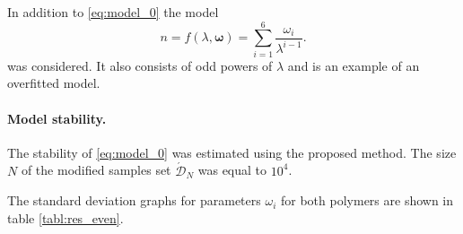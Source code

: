 \documentclass[11pt,a4paper]{article}
\theoremstyle{definition}
\begin{document}
In addition to \eqref{eq:model_0} the model
\begin{equation}
  n = f(\lambda, \boldsymbol{\omega}) = \sum_{i = 1}^6 \frac{\omega_i}{\lambda^{i - 1}}.
  \label{eq:model_incorrect}
\end{equation}
was considered. It also consists of odd powers of $\lambda$ and is an example
of an overfitted model.

\paragraph{Model stability.}
The stability of \eqref{eq:model_0} was estimated using the proposed method.
The size $N$ of the modified samples set $\acute{\mathcal{D}}_N$ was equal to $10^4$.

The standard deviation graphs for parameters $\omega_i$ for both polymers are shown in
table \ref{tabl:res_even}.
\end{document}
